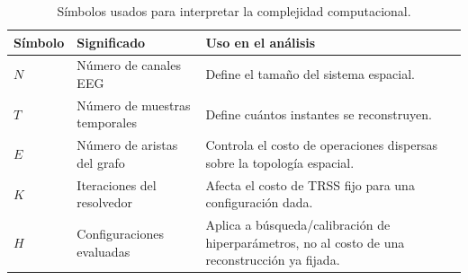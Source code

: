 \begin{table}[htbp]
\centering
\small
\setlength{\tabcolsep}{5pt}
\caption{Símbolos usados para interpretar la complejidad computacional.}
\label{tab:ch4_complexity_symbols}
\begin{tabular}{@{}>{\raggedright\arraybackslash}p{1.4cm}>{\raggedright\arraybackslash}p{4.1cm}>{\raggedright\arraybackslash}p{5.7cm}@{}}
\toprule
Símbolo & Significado & Uso en el análisis \\
\midrule
$N$ & Número de canales EEG & Define el tamaño del sistema espacial. \\
$T$ & Número de muestras temporales & Define cuántos instantes se reconstruyen. \\
$E$ & Número de aristas del grafo & Controla el costo de operaciones dispersas sobre la topología espacial. \\
$K$ & Iteraciones del resolvedor & Afecta el costo de TRSS fijo para una configuración dada. \\
$H$ & Configuraciones evaluadas & Aplica a búsqueda/calibración de hiperparámetros, no al costo de una reconstrucción ya fijada. \\
\bottomrule
\end{tabular}
\end{table}
